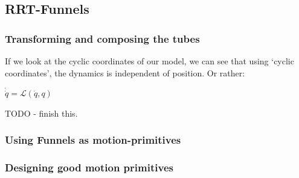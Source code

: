 \subsection{RRT-Funnels}


\subsubsection{Transforming and composing the tubes}

If we look at the cyclic coordinates of our model, we can see that using `cyclic
coordinates', the dynamics is independent of position. Or rather:

\begin{math}
  \dot{\dot{q}} = \mathcal{L}(\dot{q},q)
\end{math}

TODO - finish this.


\subsubsection{Using Funnels as motion-primitives}

\subsubsection{Designing good motion primitives}
